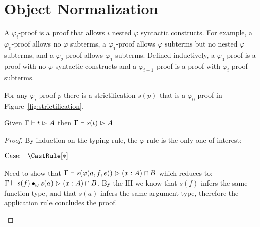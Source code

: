 \chapter{Object Normalization}

A $\varphi_i$-proof is a proof that allows $i$ nested $\varphi$ syntactic constructs.
For example, a $\varphi_0$-proof allows no $\varphi$ subterms, a $\varphi_1$-proof allows $\varphi$ subterms but no nested $\varphi$ subterms, and a $\varphi_2$-proof allows $\varphi_1$ subterms.
Defined inductively, a $\varphi_0$-proof is a proof with no $\varphi$ syntactic constructs and a $\varphi_{i+1}$-proof is a proof with $\varphi_i$-proof subterms.

For any $\varphi_i$-proof $p$ there is a strictification $s(p)$ that is a $\varphi_0$-proof in Figure~\ref{fig:strictification}.

\begin{lemma}
    Given $\Gamma \vdash t \vartriangleright A$ then $\Gamma \vdash s(t) \vartriangleright A$
\end{lemma}
\begin{proof}
    By induction on the typing rule, the $\varphi$ rule is the only one of interest:

    $\text{Case: }\begin{array}{c} \CastRule[*] \end{array}$
    \begin{proofcase}
        Need to show that $\Gamma \vdash s(\varphi(a, f, e)) \vartriangleright (x:A) \cap B$ which reduces to:
        $\Gamma \vdash s(f) \bullet_{\omega} s(a) \vartriangleright (x:A) \cap B$.
        By the IH we know that $s(f)$ infers the same function type, and that $s(a)$ infers the same argument type, therefore the application rule concludes the proof.
        
    \end{proofcase}

\end{proof}

